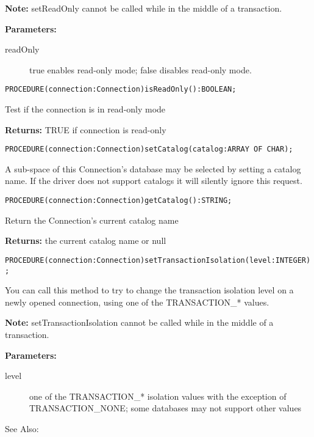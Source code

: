      {\bf Note:} setReadOnly cannot be called while in the middle of a transaction. 

     {\bf Parameters:} 
\begin{description}
\item[readOnly] true enables read-only mode; false disables read-only mode. 
\end{description}


\verb'PROCEDURE(connection:Connection)isReadOnly():BOOLEAN;'

     Test if the connection is in read-only mode 

     {\bf Returns:} 
          TRUE if connection is read-only 


\verb'PROCEDURE(connection:Connection)setCatalog(catalog:ARRAY OF CHAR);'

     A sub-space of this Connection's database may be selected by setting a catalog name. If the driver does not support catalogs it
     will silently ignore this request. 


\verb'PROCEDURE(connection:Connection)getCatalog():STRING;'

     Return the Connection's current catalog name 

     {\bf Returns:} 
          the current catalog name or null 


\verb'PROCEDURE(connection:Connection)setTransactionIsolation(level:INTEGER);'

     You can call this method to try to change the transaction isolation level on a newly opened connection, using one of the
     TRANSACTION\_* values. 

     {\bf Note:} setTransactionIsolation cannot be called while in the middle of a transaction. 

     {\bf Parameters:} 
\begin{description}
\item[level] one of the TRANSACTION\_* isolation values with the exception of TRANSACTION\_NONE; some databases may
          not support other values 
\end{description}

     {See Also:} 


